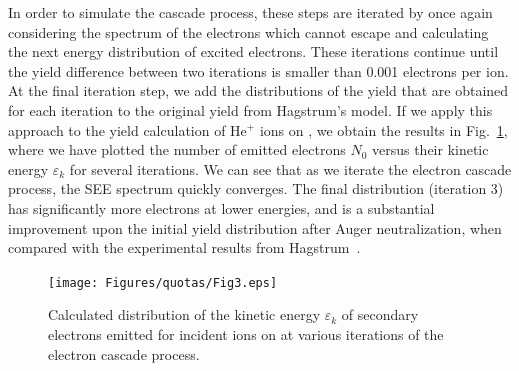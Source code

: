 \begin{refsection}
In order to simulate the cascade process, these steps are iterated by once 
again considering the spectrum of the electrons which cannot escape and 
calculating the next energy distribution of excited electrons. These 
iterations continue until the yield difference between two iterations is 
smaller than 0.001 electrons per ion. At the final iteration step, we add the 
distributions of the yield that are obtained for each iteration to the 
original yield from Hagstrum's model. If we apply this approach to the yield 
calculation of He$^+$ ions on , we obtain the results in 
Fig.~\ref{quotas:fig-iterations}, where we have plotted the number of emitted 
electrons $N_0$ versus their kinetic energy $\varepsilon_k$ for several 
iterations. We can see that as we iterate the electron cascade process, the 
\gls{SEE} spectrum quickly converges. The final distribution (iteration 3) has 
significantly more electrons at lower energies, and is a substantial 
improvement upon the initial yield distribution after Auger neutralization, 
when compared with the experimental results from Hagstrum~\cite{Hagstrum1960}. 
 
\begin{figure}[ht] 
\centering 
\captionsetup{width=0.9\textwidth}
\texttt{[image: Figures/quotas/Fig3.eps]} 
\caption{\label{quotas:fig-iterations} Calculated distribution of the kinetic 
energy $\varepsilon_k$ of secondary electrons emitted for incident  
ions on  at various iterations of the electron cascade process.} 
\end{figure} 



\end{refsection}
